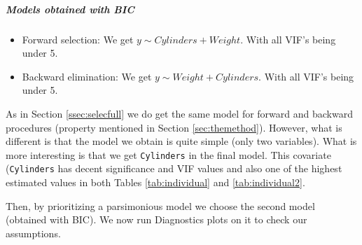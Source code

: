 \documentclass[12pt]{article}
\begin{document}
\subparagraph{Models obtained with BIC}
\begin{itemize}
\item Forward selection: We get $y \sim  Cylinders + Weight$. With all VIF's being under 5.
\item Backward elimination: We get $y \sim Weight + Cylinders$. With all VIF's being under 5.
\end{itemize}
As in Section \ref{ssec:selecfull} we do get the same model for forward and backward procedures (property mentioned in Section \ref{sec:themethod}). However, what is
different is that the model we obtain is quite simple (only two variables). What is more
interesting is that we get \texttt{Cylinders} in the final model. This covariate (\texttt{Cylinders} has decent
significance and VIF values and also one of the highest estimated values in both Tables \ref{tab:individual} and \ref{tab:individual2}.

Then, by prioritizing a parsimonious model we choose the second model (obtained with BIC). We now
run Diagnostics plots on it to check our assumptions.
\end{document}
